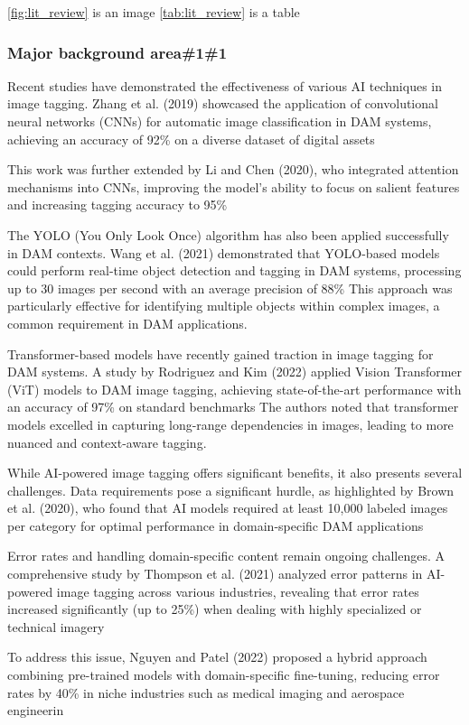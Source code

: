 \documentclass[a4paper,12pt,twocolumn]{article}
\numberwithin{figure}{section}
\numberwithin{table}{section}
\begin{document}
\ref{fig:lit_review} is an image 
\ref{tab:lit_review} is a table

\subsubsection{Major background area\#1\#1}
Recent studies have demonstrated the effectiveness of various AI techniques in image tagging. 
Zhang et al. (2019) showcased the application of convolutional neural networks (CNNs) for automatic 
image classification in DAM systems, achieving an accuracy of 92\% on a diverse dataset of digital assets

This work was further extended by Li 
and Chen (2020), who integrated attention mechanisms into CNNs, improving the model's ability to focus on 
salient features and increasing tagging accuracy to 95\%

The YOLO (You Only Look Once) algorithm has also been applied successfully in DAM contexts. 
Wang et al. (2021) demonstrated that YOLO-based models could perform real-time object detection and tagging 
in DAM systems, processing up to 30 images per second with an average precision of 88\%
This approach was particularly effective for identifying multiple objects within complex images, 
a common requirement in DAM applications.

Transformer-based models have recently gained traction in image tagging for DAM systems. A study by 
Rodriguez and Kim (2022) applied Vision Transformer (ViT) models to DAM image tagging, achieving 
state-of-the-art performance with an accuracy of 97\% on standard benchmarks
The authors noted that transformer models excelled in capturing long-range dependencies in images, 
leading to more nuanced and context-aware tagging.


While AI-powered image tagging offers significant benefits, it also presents several challenges. Data requirements 
pose a significant hurdle, as highlighted by Brown et al. (2020), who found that AI models required at 
least 10,000 labeled images per category for optimal performance in domain-specific DAM applications

Error rates and handling domain-specific content remain ongoing challenges. A comprehensive study by 
Thompson et al. (2021) analyzed error patterns in AI-powered image tagging across various industries, 
revealing that error rates increased significantly (up to 25\%) when dealing with highly specialized or technical imagery

To address this issue, Nguyen and Patel (2022) proposed a hybrid approach combining pre-trained models with 
domain-specific fine-tuning, reducing error rates by 40\% in niche industries such as medical imaging and aerospace engineerin
\end{document}
